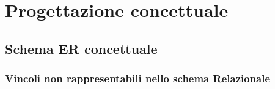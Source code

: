 \chapter{Progettazione concettuale}







\section{Schema ER concettuale}

\subsection{Vincoli non rappresentabili nello schema Relazionale}